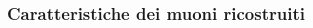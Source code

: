 \documentclass{beamer}
\begin{document}
\begin{frame}
\frametitle{Caratteristiche dei muoni ricostruiti}

\begin{columns}
\begin{column}{.09\textwidth}
\end{column}
\begin{column}{.41\textwidth}
\centering
{}
\end{column}
\begin{column}{.41\textwidth}
\centering
{}
\end{column}
\begin{column}{.09\textwidth}
\end{column}
\end{columns}

\begin{columns}
\begin{column}{.09\textwidth}
\end{column}
\begin{column}{.41\textwidth}
\centering
{}
\end{column}
\begin{column}{.41\textwidth}
\centering
{}
\end{column}
\begin{column}{.09\textwidth}
\end{column}
\end{columns}


\end{frame}
\end{document}
